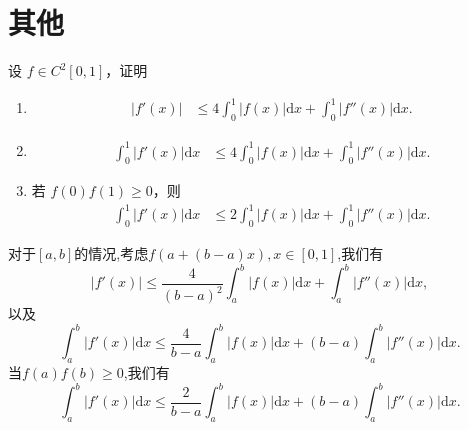 \documentclass[../../main.tex]{subfiles}%
\begin{document}
\section{其他}

\begin{example}
设 \( f \in C^2[0,1] \)，证明
\begin{enumerate}[(1)]
\item 
\begin{align}
|f'(x)| &\leqslant 4\int_0^1 |f(x)| \mathrm{d}x + \int_0^1 |f''(x)| \mathrm{d}x. \label{eq::::::::::::::7151--------------5}
\end{align}

\item 
\begin{align}
\int_0^1 |f'(x)| \mathrm{d}x &\leqslant 4\int_0^1 |f(x)| \mathrm{d}x + \int_0^1 |f''(x)| \mathrm{d}x .\label{eq::::::::::::::7151--------------6}
\end{align}

\item  若 \( f(0)f(1) \geqslant 0 \)，则
\begin{align}
\int_0^1 |f'(x)| \mathrm{d}x &\leqslant 2\int_0^1 |f(x)| \mathrm{d}x + \int_0^1 |f''(x)| \mathrm{d}x. \label{eq::::::::::::::7151--------------7}
\end{align}
\end{enumerate}
\end{example}
\begin{note}
对于$[a,b]$的情况,考虑$f(a+(b-a)x),x\in[0,1]$,我们有
\[
|f'(x)|\leqslant \frac{4}{(b-a)^2}\int_a^b|f(x)|\mathrm{d}x+\int_a^b|f''(x)|\mathrm{d}x,
\]
以及
\[
\int_a^b|f'(x)|\mathrm{d}x\leqslant \frac{4}{b-a}\int_a^b|f(x)|\mathrm{d}x+(b-a)\int_a^b|f''(x)|\mathrm{d}x.
\]
当$f(a)f(b)\geqslant 0$,我们有
\[
\int_a^b|f'(x)|\mathrm{d}x\leqslant \frac{2}{b-a}\int_a^b|f(x)|\mathrm{d}x+(b-a)\int_a^b|f''(x)|\mathrm{d}x.
\]
\end{note}
\end{document}
